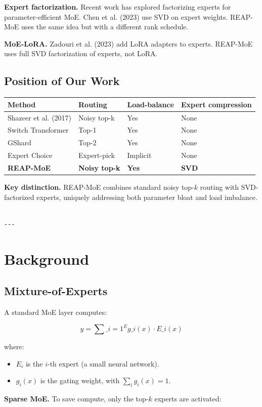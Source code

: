 \textbf{Expert factorization.} Recent work has explored factorizing experts for 
parameter-efficient MoE. Chen et al. (2023) use SVD on expert weights. 
REAP-MoE uses the same idea but with a different rank schedule.

\textbf{MoE-LoRA.} Zadouri et al. (2023) add LoRA adapters to experts. REAP-MoE 
uses full SVD factorization of experts, not LoRA.

\subsection{Position of Our Work}

\begin{table}[H]
\centering
\small
\begin{tabular}{llll}
\toprule
\textbf{Method} & \textbf{Routing} & \textbf{Load-balance} & \textbf{Expert compression} \\
\midrule
Shazeer et al. (2017) & Noisy top-k & Yes & None \\
Switch Transformer & Top-1 & Yes & None \\
GShard & Top-2 & Yes & None \\
Expert Choice & Expert-pick & Implicit & None \\
\textbf{REAP-MoE} & \textbf{Noisy top-k} & \textbf{Yes} & \textbf{SVD} \\
\bottomrule
\end{tabular}
\end{table}

\textbf{Key distinction.} REAP-MoE combines standard noisy top-$k$ routing with 
SVD-factorized experts, uniquely addressing both parameter bloat and load 
imbalance.
\begin{lstlisting}

---
\end{lstlisting}

\section{Background}

\subsection{Mixture-of-Experts}

A standard MoE layer computes:

\[
y = \sum\_{i=1}^{E} g\_i(x) \cdot E\_i(x)
\tag{3.1}
\]

where:
\begin{itemize}
\item $E_i$ is the $i$-th expert (a small neural network).
\item $g_i(x)$ is the gating weight, with $\sum_i g_i(x) = 1$.

\end{itemize}
\textbf{Sparse MoE.} To save compute, only the top-$k$ experts are activated:

